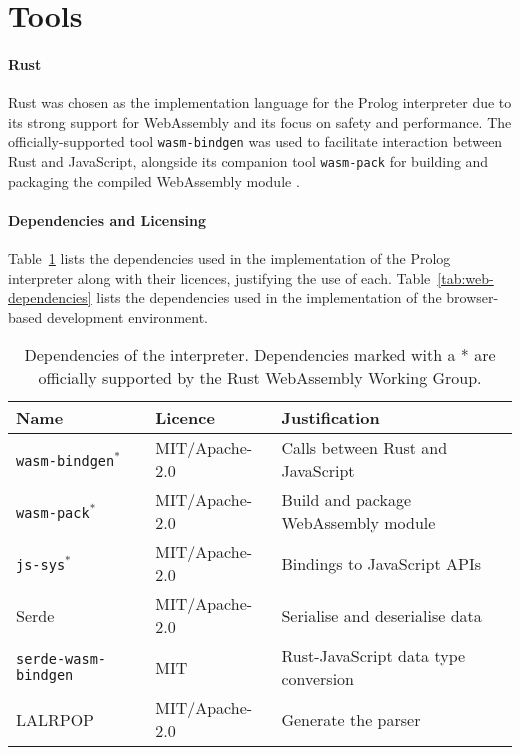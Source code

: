 \section{Tools}

\label{sec:tools}

\paragraph{Rust}

Rust was chosen as the implementation language for the Prolog interpreter due to its strong support for WebAssembly and its focus on safety and performance. The officially-supported tool \texttt{wasm-bindgen} was used to facilitate interaction between Rust and JavaScript, alongside its companion tool \texttt{wasm-pack} for building and packaging the compiled WebAssembly module \cite{crichtonwasmbindgenhttpsgithubcom2014}.

\paragraph{Dependencies and Licensing}

Table~\ref{tab:core-dependencies} lists the dependencies used in the implementation of the Prolog interpreter along with their licences, justifying the use of each. Table~\ref{tab:web-dependencies} lists the dependencies used in the implementation of the browser-based development environment.

\begin{table}[H]
\centering
\begin{tabular}{lll}
\hline
\textbf{Name} & \textbf{Licence} & \textbf{Justification} \\
\hline
\texttt{wasm-bindgen}$^*$ & MIT/Apache-2.0 & Calls between Rust and JavaScript \\
\texttt{wasm-pack}$^*$ & MIT/Apache-2.0 & Build and package WebAssembly module \\
\texttt{js-sys}$^*$ & MIT/Apache-2.0 & Bindings to JavaScript APIs \\
Serde & MIT/Apache-2.0 & Serialise and deserialise data \\
\texttt{serde-wasm-bindgen} & MIT & Rust-JavaScript data type conversion \\
LALRPOP & MIT/Apache-2.0 & Generate the parser \\
\hline
\end{tabular}
\caption{Dependencies of the interpreter. Dependencies marked with a * are officially supported by the Rust WebAssembly Working Group.}
\label{tab:core-dependencies}
\end{table}

